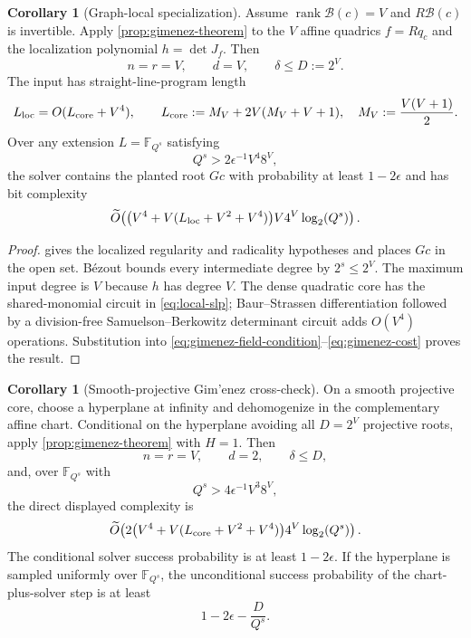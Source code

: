 \documentclass[11pt,a4paper]{article}
\theoremstyle{definition}
\newtheorem{corollary}[theorem]{Corollary}
\theoremstyle{remark}
\newcommand{\F}{\mathbb F}
\newcommand{\rank}{\operatorname{rank}}
\begin{document}
\begin{corollary}[Graph-local specialization]\label{cor:gimenez-local}
Assume $\rank\mathcal B(c)=V$ and $R\mathcal B(c)$ is invertible.  Apply \cref{prop:gimenez-theorem} to the $V$ affine quadrics $f=Rq_c$ and the localization polynomial $h=\det J_f$.  Then
\[
 n=r=V,\qquad d=V,\qquad \delta\le D:=2^V.
\]
The input has straight-line-program length
\begin{equation}\label{eq:local-slp}
 L_{\rm loc}=O(L_{\rm core}+V^4),
 \qquad
 L_{\rm core}:=M_V+2V(M_V+V+1),
 \quad M_V:=\frac{V(V+1)}2.
\end{equation}
Over any extension $L=\F_{Q^s}$ satisfying
\begin{equation}\label{eq:local-field-condition}
 Q^s>2\epsilon^{-1}V^4 8^V,
\end{equation}
the solver contains the planted root $Gc$ with probability at least $1-2\epsilon$ and has bit complexity
\begin{equation}\label{eq:local-solver-cost}
 \widetilde O\!\left(
 \bigl(V^4+V(L_{\rm loc}+V^2+V^4)\bigr)V4^V\log_2(Q^s)
 \right).
\end{equation}
\end{corollary}

\begin{proof}
 gives the localized regularity and radicality hypotheses and places $Gc$ in the open set.  B\'ezout bounds every intermediate degree by $2^s\le2^V$.  The maximum input degree is $V$ because $h$ has degree $V$.  The dense quadratic core has the shared-monomial circuit in \eqref{eq:local-slp}; Baur--Strassen differentiation followed by a division-free Samuelson--Berkowitz determinant circuit adds $O(V^4)$ operations.  Substitution into \eqref{eq:gimenez-field-condition}--\eqref{eq:gimenez-cost} proves the result.
\end{proof}

\begin{corollary}[Smooth-projective Gim'enez cross-check]\label{cor:gimenez-projective}
On a smooth projective core, choose a hyperplane at infinity and dehomogenize in the complementary affine chart.  Conditional on the hyperplane avoiding all $D=2^V$ projective roots, apply \cref{prop:gimenez-theorem} with $H=1$.  Then
\[
 n=r=V,\qquad d=2,\qquad\delta\le D,
\]
and, over $\F_{Q^s}$ with
\begin{equation}\label{eq:projective-gimenez-field}
 Q^s>4\epsilon^{-1}V^3 8^V,
\end{equation}
the direct displayed complexity is
\begin{equation}\label{eq:projective-gimenez-cost}
 \widetilde O\!\left(
  2\bigl(V^4+V(L_{\rm core}+V^2+V^4)\bigr)4^V\log_2(Q^s)
 \right).
\end{equation}
The conditional solver success probability is at least $1-2\epsilon$.  If the hyperplane is sampled uniformly over $\F_{Q^s}$, the unconditional success probability of the chart-plus-solver step is at least
\begin{equation}\label{eq:projective-gimenez-success}
 1-2\epsilon-\frac{D}{Q^s}.
\end{equation}
\end{corollary}
\end{document}
